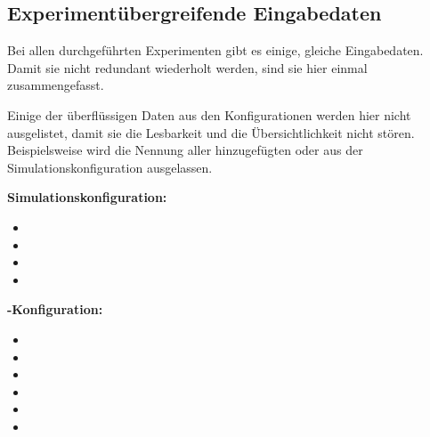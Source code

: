 %

\subsection{Experimentübergreifende Eingabedaten}\label{subsec:input-data}

Bei allen durchgeführten Experimenten gibt es einige, gleiche Eingabedaten.
Damit sie nicht redundant wiederholt werden, sind sie hier einmal zusammengefasst.

Einige der überflüssigen Daten aus den Konfigurationen werden hier nicht ausgelistet, damit sie die Lesbarkeit und die Übersichtlichkeit nicht stören.
Beispielsweise wird die Nennung aller hinzugefügten  oder  aus der Simulationskonfiguration ausgelassen.

\textbf{Simulationskonfiguration:}
\begin{itemize}
    \item {}
    \item {}
    \item {}
    \item {}
\end{itemize}

\textbf{-Konfiguration:}
\begin{itemize}
    \item {}
    \item {}
    \item {}
    \item {}
    \item {}
    \item {}
\end{itemize}
